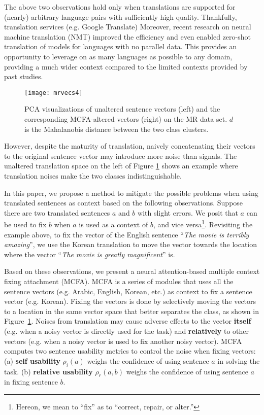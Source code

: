 \documentclass{article}
\begin{document}
The above two observations hold only when translations are supported for (nearly) arbitrary language pairs with sufficiently high quality.
Thankfully, translation services (e.g. Google Translate)
Moreover, recent research on neural machine translation (NMT) \cite{bahdanau2014neural} improved the efficiency
and even enabled 
zero-shot translation \cite{johnson2016google} 
of models
for languages with no parallel data.
This provides an opportunity to leverage on as many languages as possible to any domain, providing a much wider context compared to the limited contexts provided by past studies.

\begin{figure}[t]
	\centering
	\texttt{[image: mrvecs4]}
	\caption{PCA visualizations of unaltered sentence vectors (left) and the corresponding MCFA-altered vectors (right)  on the MR data set.
	$d$ is the Mahalanobis distance between the two class clusters.
}
	\label{fig:mrvecs}
\end{figure}

However, despite the maturity of translation,
naively concatenating their vectors to the original sentence vector
may introduce more noise 
than signals.
The unaltered translation space on the left of Figure \ref{fig:mrvecs} shows an example
where translation noises make the two classes indistinguishable.




In this paper, we propose a method to mitigate the possible problems when using translated sentences as context based on the following observations. Suppose there are two translated sentences $a$ and $b$ with slight errors. We posit that $a$ can be used to fix $b$ when $a$ is used as a context of $b$, and vice versa\footnote{Hereon, we mean to ``fix'' as to ``correct, repair, or alter.''}. Revisiting the example above, to fix the vector of the English sentence ``\textit{The movie is terribly amazing}'', we use the Korean translation to move the vector towards the location where the vector ``\textit{The movie is greatly magnificent}'' is.






Based on these observations, we present a neural attention-based multiple context fixing attachment (MCFA). MCFA is a series of modules that uses all the sentence vectors (e.g. Arabic, English, Korean, etc.) as context to fix a sentence vector (e.g. Korean). 
Fixing the vectors is done by selectively moving the vectors to a location in the same vector space that better separates the class, as shown in Figure~\ref{fig:mrvecs}.
Noises from translation may cause adverse effects to the vector
\textbf{itself} (e.g. when a noisy vector is directly used for the task) and \textbf{relatively} to other vectors (e.g. when a noisy vector is used to fix another noisy vector).
MCFA computes two sentence
usability metrics to control the noise when fixing vectors:
(a) \textbf{self usability} $\rho_i(a)$ weighs the confidence of using sentence $a$ in solving the task.
(b) \textbf{relative usability} $\rho_r(a, b)$ weighs the confidence of using sentence $a$ in fixing sentence $b$.
\end{document}
